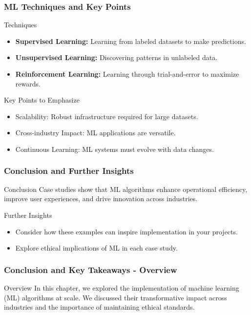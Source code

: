 \documentclass[aspectratio=169]{beamer}
\begin{document}
\begin{frame}[fragile]
    \frametitle{ML Techniques and Key Points}
    \begin{block}{Techniques}
        \begin{itemize}
            \item \textbf{Supervised Learning:} Learning from labeled datasets to make predictions.
            \item \textbf{Unsupervised Learning:} Discovering patterns in unlabeled data.
            \item \textbf{Reinforcement Learning:} Learning through trial-and-error to maximize rewards.
        \end{itemize}
    \end{block}
    \begin{block}{Key Points to Emphasize}
        \begin{itemize}
            \item Scalability: Robust infrastructure required for large datasets.
            \item Cross-industry Impact: ML applications are versatile.
            \item Continuous Learning: ML systems must evolve with data changes.
        \end{itemize}
    \end{block}
\end{frame}

\begin{frame}[fragile]
    \frametitle{Conclusion and Further Insights}
    \begin{block}{Conclusion}
        Case studies show that ML algorithms enhance operational efficiency, improve user experiences, and drive innovation across industries.
    \end{block}
    \begin{block}{Further Insights}
        \begin{itemize}
            \item Consider how these examples can inspire implementation in your projects.
            \item Explore ethical implications of ML in each case study.
        \end{itemize}
    \end{block}
\end{frame}

\begin{frame}[fragile]
    \frametitle{Conclusion and Key Takeaways - Overview}
    \begin{block}{Overview}
        In this chapter, we explored the implementation of machine learning (ML) algorithms at scale. 
        We discussed their transformative impact across industries and the importance of maintaining ethical standards. 
    \end{block}
\end{frame}
\end{document}
